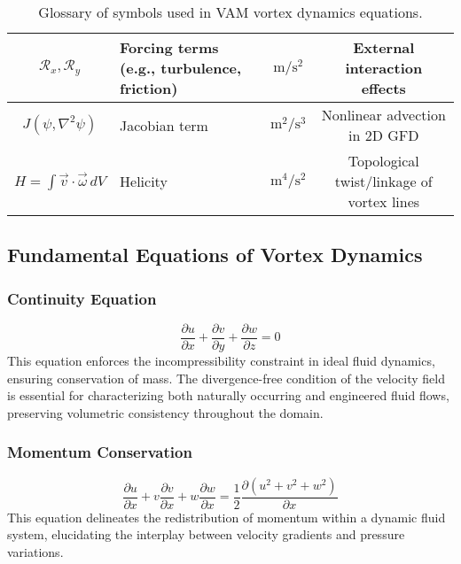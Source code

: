 \documentclass[12pt]{article}
\begin{document}
\begin{table}[H]
\begin{tabular}{|c|l|c|c|}
            $\mathcal{R}_x, \mathcal{R}_y$ & Forcing terms (e.g., turbulence, friction) & $\mathrm{m/s^2}$ & External interaction effects \\
            \hline
            $J(\psi, \nabla^2\psi)$ & Jacobian term & $\mathrm{m^2/s^3}$ & Nonlinear advection in 2D GFD \\
            \hline
            $H = \int \vec{v} \cdot \vec{\omega} \, dV$ & Helicity & $\mathrm{m^4/s^2}$ & Topological twist/linkage of vortex lines \\
            \hline
        \end{tabular}
        \caption{Glossary of symbols used in VAM vortex dynamics equations.}
        \label{tab:vam_vorticity_symbols}
    \end{table}


    \subsection{Fundamental Equations of Vortex Dynamics}

    \subsubsection*{Continuity Equation}
    \begin{equation*}
        \frac{\partial u}{\partial x} + \frac{\partial v}{\partial y} + \frac{\partial w}{\partial z} = 0
    \end{equation*}
    This equation enforces the incompressibility constraint in ideal fluid dynamics, ensuring conservation of mass. The divergence-free condition of the velocity field is essential for characterizing both naturally occurring and engineered fluid flows, preserving volumetric consistency throughout the domain.

    \subsubsection*{Momentum Conservation}
    \begin{equation*}
        \frac{\partial u}{\partial x} + v \frac{\partial v}{\partial x} + w \frac{\partial w}{\partial x} = \frac{1}{2} \frac{\partial (u^2 + v^2 + w^2)}{\partial x}
    \end{equation*}
    This equation delineates the redistribution of momentum within a dynamic fluid system, elucidating the interplay between velocity gradients and pressure variations.
\end{document}

